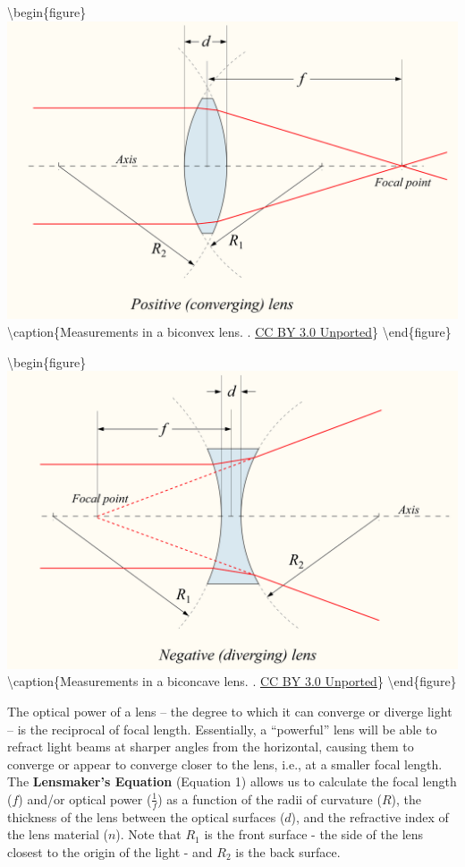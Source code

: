 \documentclass[
]{book}
\begin{document}
\textbackslash begin\{figure\}
\includegraphics[width=0.9\linewidth]{images/12-convex_focal_diagram} \textbackslash caption\{Measurements in a biconvex lens. \citep{drbob_positive_2006}. \href{https://creativecommons.org/licenses/by/3.0/}{CC BY 3.0 Unported}\}\label{fig:12-convex-focal-diagram}
\textbackslash end\{figure\}

\textbackslash begin\{figure\}
\includegraphics[width=0.9\linewidth]{images/12-concave_focal_diagram} \textbackslash caption\{Measurements in a biconcave lens. \citep{drbob_negative_2006}. \href{https://creativecommons.org/licenses/by/3.0/}{CC BY 3.0 Unported}\}\label{fig:12-concave-focal-diagram}
\textbackslash end\{figure\}

The optical power of a lens -- the degree to which it can converge or diverge light -- is the reciprocal of focal length. Essentially, a ``powerful'' lens will be able to refract light beams at sharper angles from the horizontal, causing them to converge or appear to converge closer to the lens, i.e., at a smaller focal length. The \textbf{Lensmaker's Equation} (Equation 1) allows us to calculate the focal length (\(f\)) and/or optical power (\(\frac{1}{f}\)) as a function of the radii of curvature (\(R\)), the thickness of the lens between the optical surfaces (\(d\)), and the refractive index of the lens material (\(n\)). Note that \(R_1\) is the front surface - the side of the lens closest to the origin of the light - and \(R_2\) is the back surface.
\end{document}
